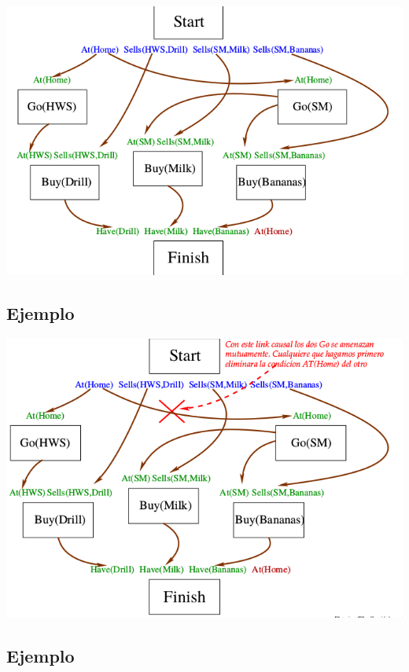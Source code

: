 \documentclass[11pt]{article}
\begin{document}
\begin{center}
\includegraphics[width=.9\linewidth]{imagenes/pop15.png}
\end{center}

\subsection*{Ejemplo}
\label{sec:org8ba6de2}

\begin{center}
\includegraphics[width=.9\linewidth]{imagenes/pop16.png}
\end{center}

\subsection*{Ejemplo}
\label{sec:org73c4c61}
\end{document}

